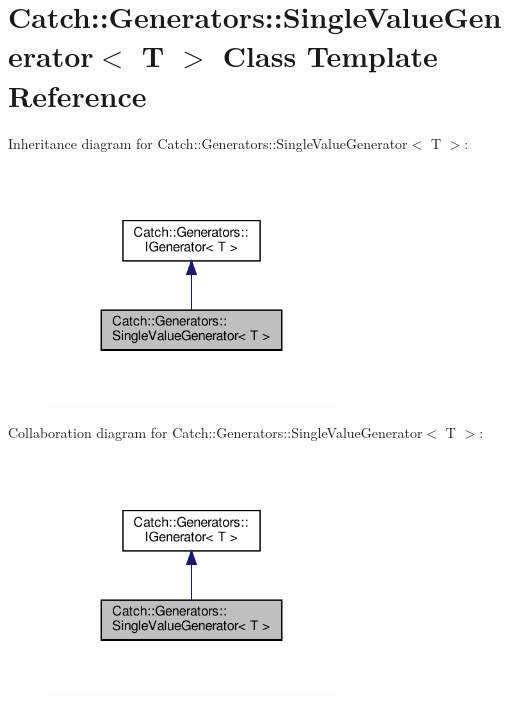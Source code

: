 \hypertarget{classCatch_1_1Generators_1_1SingleValueGenerator}{}\section{Catch\+::Generators\+::Single\+Value\+Generator$<$ T $>$ Class Template Reference}
\label{classCatch_1_1Generators_1_1SingleValueGenerator}


Inheritance diagram for Catch\+::Generators\+::Single\+Value\+Generator$<$ T $>$\+:
\nopagebreak
\begin{figure}[H]
\begin{center}
\leavevmode
\includegraphics[width=215pt]{classCatch_1_1Generators_1_1SingleValueGenerator__inherit__graph}
\end{center}
\end{figure}


Collaboration diagram for Catch\+::Generators\+::Single\+Value\+Generator$<$ T $>$\+:
\nopagebreak
\begin{figure}[H]
\begin{center}
\leavevmode
\includegraphics[width=215pt]{classCatch_1_1Generators_1_1SingleValueGenerator__coll__graph}
\end{center}
\end{figure}
